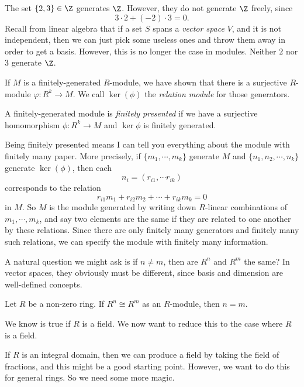 \documentclass[a4paper]{article}
\begin{document}
\begin{eg}
  The set $\{2, 3\} \in \Z$ generates $\Z$. However, they do not generate $\Z$ freely, since
  \[
    3\cdot 2 + (-2) \cdot 3 = 0.
  \]
  Recall from linear algebra that if a set $S$ spans a \emph{vector space} $V$, and it is not independent, then we can just pick some useless ones and throw them away in order to get a basis. However, this is no longer the case in modules. Neither $2$ nor $3$ generate $\Z$.
\end{eg}

\begin{defi}[Relations]
  If $M$ is a finitely-generated $R$-module, we have shown that there is a surjective $R$-module $\varphi: R^k \to M$. We call $\ker(\phi)$ the \emph{relation module} for those generators.
\end{defi}

\begin{defi}
  A finitely-generated module is \emph{finitely presented} if we have a surjective homomorphism $\phi: R^k \to M$ and $\ker \phi$ is finitely generated.
\end{defi}

Being finitely presented means I can tell you everything about the module with finitely many paper. More precisely, if $\{m_1, \cdots, m_k\}$ generate $M$ and $\{n_1, n_2, \cdots, n_k\}$ generate $\ker(\phi)$, then each
\[
  n_i = (r_{i1}, \cdots r_{ik})
\]
corresponds to the relation
\[
  r_{i1}m_1 + r_{i2}m_2 + \cdots + r_{ik}m_k = 0
\]
in $M$. So $M$ is the module generated by writing down $R$-linear combinations of $m_1, \cdots, m_k$, and say two elements are the same if they are related to one another by these relations. Since there are only finitely many generators and finitely many such relations, we can specify the module with finitely many information.

A natural question we might ask is if $n \not= m$, then are $R^n$ and $R^m$ the same? In vector spaces, they obviously must be different, since basis and dimension are well-defined concepts.

\begin{prop}
  Let $R$ be a non-zero ring. If $R^n \cong R^m$ as an $R$-module, then $n = m$.
\end{prop}
We know is true if $R$ is a field. We now want to reduce this to the case where $R$ is a field.

If $R$ is an integral domain, then we can produce a field by taking the field of fractions, and this might be a good starting point. However, we want to do this for general rings. So we need some more magic.
\end{document}
